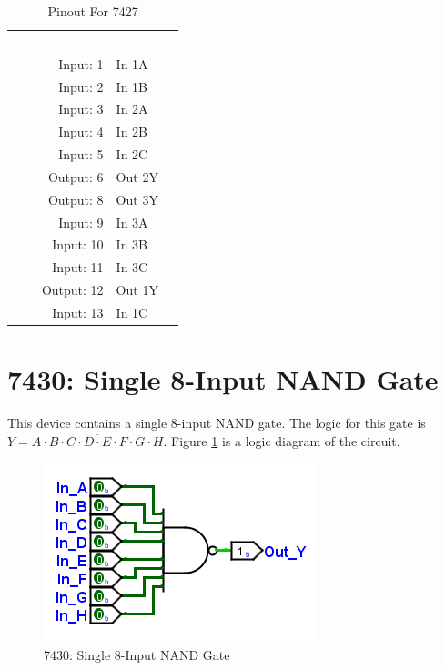 \begin{table}[H]
	\sffamily
	\newcommand{\head}[1]{\textcolor{white}{\textbf{#1}}}		
	\begin{center}
		\begin{tabular}{rl} 
			\rowcolor{black!75}
			\head{Logisim Label} & \head{Function} \\
			Input: 1   & In 1A  \\
			Input: 2   & In 1B  \\
			Input: 3   & In 2A \\
			Input: 4   & In 2B  \\
			Input: 5   & In 2C  \\
			Output: 6  & Out 2Y \\
			Output: 8  & Out 3Y \\
			Input: 9   & In 3A  \\
			Input: 10  & In 3B  \\
			Input: 11  & In 3C \\
			Output: 12 & Out 1Y  \\
			Input: 13  & In 1C  \\
		\end{tabular}
	\end{center}
	\caption{Pinout For 7427}
	\label{tab:50-7427}
\end{table}

\section{7430: Single 8-Input NAND Gate}

This device contains a single 8-input NAND gate. The logic for this gate is $ Y = \overline{A \cdot B \cdot C \cdot D \cdot E \cdot F \cdot G \cdot H} $. Figure \ref{fig:app_ttl-7430} is a logic diagram of the circuit.

\begin{figure}[H]
	\centering
	\includegraphics{gfx/app_ttl-7430}
	\caption{7430: Single 8-Input NAND Gate}
	\label{fig:app_ttl-7430}
\end{figure}

